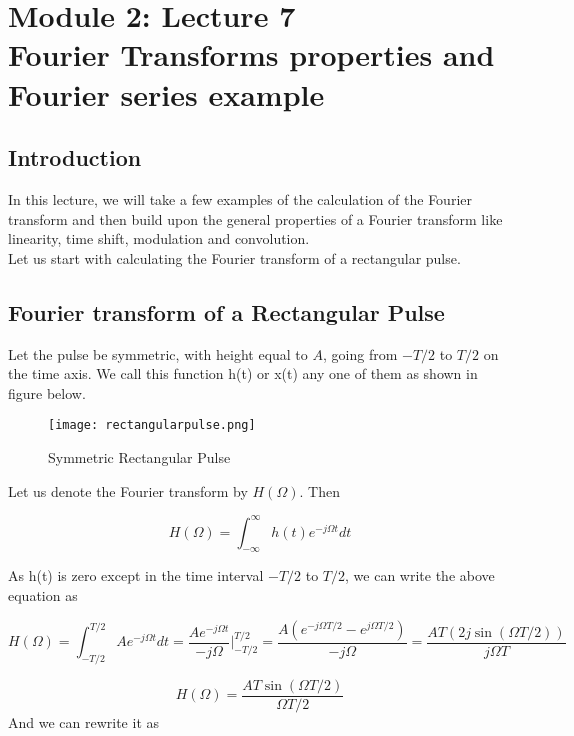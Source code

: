 \section{Module 2: Lecture 7\\Fourier Transforms properties and Fourier series example}

\subsection{Introduction}
 In this lecture, we will take a few examples of the calculation of the Fourier transform and then build upon the general properties of a Fourier transform like linearity, time shift, modulation and convolution. \\
Let us start with calculating the Fourier transform of a rectangular pulse.
\subsection{Fourier transform of a Rectangular Pulse}
Let the pulse be symmetric, with height equal to $A$, going from $-T/2$ to $T/2$ on the time axis. We call this function h(t) or x(t) any one of them as shown in figure below.

\begin{figure}[htp]
\centering
\texttt{[image: rectangularpulse.png]}
\caption{Symmetric Rectangular Pulse}
\label{rectangular_pulse}
\end{figure}

Let us denote the Fourier transform by $ H(\Omega)$. Then

\begin{equation}
H(\Omega)=\int_{-\infty}^{\infty}{h(t) e^{-j\Omega t}}dt
\end{equation}

As h(t) is zero except in the time interval $-T/2$ to $T/2$, we can write the above equation as

\begin{equation}
H(\Omega)=\int_{-T/2}^{T/2}{A e^{-j\Omega t}}dt =
\frac{A e^{-j\Omega t}}{-j \Omega} \Bigg|_{-T/2}^{T/2}=
\frac{A(e^{-j\Omega T/2}-e^{j\Omega T/2})}{-j\Omega}
=\frac{AT (2j\sin({\Omega T/2}))}{j\Omega T}
\end{equation}

\begin{equation}
H(\Omega)=\frac{AT\sin({\Omega T/2})}{\Omega T/2}
\end{equation}
And we can rewrite it as

